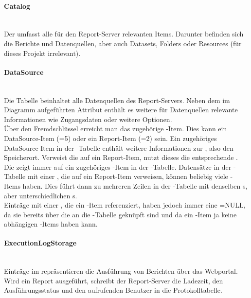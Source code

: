 \paragraph{Catalog}~\\\label{p:Catalog}
Der  umfasst alle für den Report-Server relevanten Items. Darunter befinden sich die Berichte und Datenquellen, aber auch \zB Datasets, Folders oder Resources (für dieses Projekt irrelevant).

\paragraph{DataSource}~\\\label{p:DataSource}
Die Tabelle  beinhaltet alle Datenquellen des Report-Servers. Neben dem im Diagramm aufgeführten Attribut  enthält es weitere für Datenquellen relevante Informationen wie Zugangsdaten oder weitere Optionen.\\
Über den Fremdschlüssel  erreicht man das zugehörige -Item. Dies kann ein Data\-Source-Item (=5) oder ein Report-Item (=2) sein. Ein zugehöriges Data\-Source-Item in der -Tabelle enthält weitere Informationen zur  \zB {}, also den Speicherort. Verweist die  auf ein Report-Item, nutzt dieses die entsprechende .\\
Die  zeigt immer auf ein zugehöriges -Item in der -Tabelle. Datensätze in der -Tabelle mit einer , die auf ein Report-Item verweisen, können beliebig viele -Items haben. Dies führt dann zu mehreren Zeilen in der -Tabelle mit denselben s, aber unterschiedlichen s.\\
Einträge mit einer , die ein -Item referenziert, haben jedoch immer eine =NULL, da sie bereits über die  an die -Tabelle geknüpft sind und da ein -Item ja keine abhängigen -Items haben kann.

\paragraph{ExecutionLogStorage}~\\\label{p:ExecutionLogStorage}
Einträge im  repräsentieren die Ausführung von Berichten über das Webportal. Wird ein Report ausgeführt, schreibt der Report-Server \ua die Ladezeit, den Ausführungsstatus und den aufrufenden Benutzer in die Protokolltabelle.

